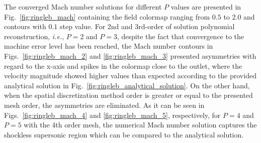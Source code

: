 The converged Mach number solutions for different $P$ values are presented in Fig.\ \ref{fig:ringleb_mach} containing the field colormap ranging from $0.5$ to $2.0$ and contours with $0.1$ step value. For 2nd and 3rd-order of solution polynomial reconstruction, {\em i.e.},  $P=2$ and $P=3$, despite the fact that convergence to the machine error level has been reached, the Mach number contours in Figs.\ \ref{fig:ringleb_mach_2} and \ref{fig:ringleb_mach_3} presented asymmetries with regard to the x-axis and spikes in the colormap close to the outlet, where the velocity magnitude showed higher values than expected according to the provided analytical solution in Fig.\ \ref{fig:ringleb_analytical_solution}. On the other hand, when the spatial discretization method order is greater or equal to the presented mesh order, the asymmetries are eliminated. As it can be seen in Figs.\ \ref{fig:ringleb_mach_4} and \ref{fig:ringleb_mach_5}, respectively, for $P=4$ and $P=5$ with the 4th order mesh, the numerical Mach number solution captures the shockless supersonic region which can be compared to the analytical solution.
